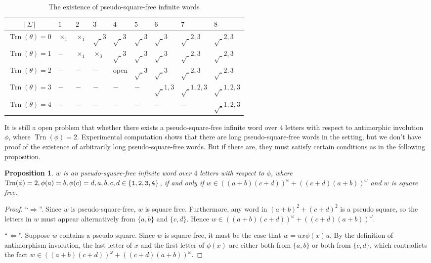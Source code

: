 \documentclass[12pt]{article}
\def\abs#1{{|\,#1\,|}}
\def\tr{{\operatorname{Trn}}}
\newtheorem{proposition}[theorem]{Proposition}
\begin{document}
\begin{table}
\centering \caption{The existence of pseudo-square-free infinite
words}
\begin{tabular}{c|p{5.5ex}p{5.5ex}p{5.5ex}p{5.5ex}p{5.5ex}p{5.5ex}p{5.5ex}p{5.5ex}}
  \hline
$\abs{\Sigma}$ & $1$ & $2$ & $3$ & $4$ & $5$ & $6$ & $7$ & $8$ \\
  \hline
  $\tr(\theta)=0$ & $\times_{1}$ & $\times_{1}$ & $\surd_{3}$ & $\surd_{3}$ & $\surd_{3}$ & $\surd_{3}$ & $\surd_{2,3}$ & $\surd_{2,3}$ \\
  $\tr(\theta)=1$ & $-$ & $\times_{1}$ & $\times_{3}$ & $\surd_{3}$ & $\surd_{3}$ & $\surd_{3}$ & $\surd_{2,3}$ & $\surd_{2,3}$ \\
  $\tr(\theta)=2$ & $-$ & $-$ & $-$ & {\small open} & $\surd_{3}$ & $\surd_{3}$ & $\surd_{2,3}$ & $\surd_{2,3}$ \\
  $\tr(\theta)=3$ & $-$ & $-$ & $-$ & $-$ & $-$ & $\surd_{1,3}$ & $\surd_{1,2,3}$ & $\surd_{1,2,3}$ \\
  $\tr(\theta)=4$ & $-$ & $-$ & $-$ & $-$ & $-$ & $-$ & $-$ & $\surd_{1,2,3}$ \\
  \hline
\end{tabular}\label{table:pseudosquare}
\end{table}


It is still a open problem that whether there exists a
pseudo-square-free infinite word over $4$ letters with respect to
antimorphic involution $\phi$, where $\tr(\phi)=2$. Experimental
computation shows that there are long pseudo-square-free words in
the setting, but we don't have proof of the existence of arbitrarily
long pseudo-square-free words. But if there are, they must satisfy
certain conditions as in the following proposition.


\begin{proposition}
$w$ is an pseudo-square-free infinite word over $4$ letters with
respect to $\phi$, where
$\tr(\phi)=2,\phi(a)=b,\phi(c)=d,a,b,c,d\in\{{\tt1,2,3,4}\}$, if and
only if $w\in ((a+b)(c+d))^\omega+((c+d)(a+b))^\omega$ and $w$ is
square free.
\end{proposition}
\begin{proof}
``$\Rightarrow$''.
Since $w$ is pseudo-square-free, $w$ is square free. Furthermore,
any word in $(a+b)^2+(c+d)^2$ is a pseudo square, so the letters in
$w$ must appear alternatively from $\{a,b\}$ and $\{c,d\}$. Hence
$w\in((a+b)(c+d))^\omega+((c+d)(a+b))^\omega$.

``$\Leftarrow$''.
Suppose $w$ contains a pseudo square. Since $w$ is square free, it
must be the case that $w=ux\phi(x)u$. By the definition of
antimorphism involution, the last letter of $x$ and the first letter
of $\phi(x)$ are either both from $\{a,b\}$ or both from $\{c,d\}$,
which contradicts the fact $w\in
((a+b)(c+d))^\omega+((c+d)(a+b))^\omega$.
\end{proof}
\end{document}
